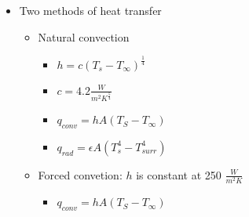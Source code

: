 \documentclass[12pt]{article}
\begin{document}
\begin{itemize}
\begin{itemize}
        \item Two methods of heat transfer \begin{itemize}
            \item Natural convection \begin{itemize}
                \item $h = c(T_s-T_{\infty})^{\frac{1}{4}}$
                \item $c = 4.2 \frac{W}{m^2 K ^{\frac{5}{4}}}$
                \item $q_{conv} = hA (T_S - T_{\infty})$
                \item $q_{rad} = \epsilon A (T_s ^4 - T_{surr}^4)$
            \end{itemize}
            \item Forced convetion: $h$ is constant at 250 $\frac{W}{m^2 K}$ \begin{itemize}
                \item $q_{conv} = h A (T_S - T_{\infty})$
            \end{itemize}
        \end{itemize}
    \end{itemize}
\end{itemize}
\end{document}
